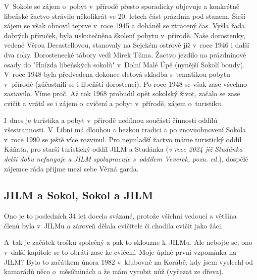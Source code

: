 \documentclass[a5paper, 11pt, twoside]{article}
\begin{document}
V~Sokole se zájem o~pobyt v~přírodě přesto sporadicky objevuje a
konkrétně libeňské žactvo strávilo několikrát ve 20. letech část
prázdnin pod stanem. Širší zájem se však obnovil teprve v~roce 1945 a
doháněl se ztracený čas. Vyšla řada dobrých příruček, byla uskutečněna
školení pobytu v~přírodě. Naše dorostenky, vedené Věrou Decastellovou,
stanovaly na Sejckém ostrově již v~roce 1946 i další dva roky.
Dorostenecké tábory vedl Mirek Tůma. Žactvo jezdilo na prázdninové osady
do "Hnízda libeňských sokolů" v~Dolní Malé Úpě (nynější Sokolí boudy).
V~roce 1948 byla předvedena dokonce sletová skladba s~tematikou pobytu
v~přírodě (zúčastnili se i libeňští dorostenci). Po roce 1948 se však zase
všechno zastavilo. Víme proč. Až rok 1968 probudil opět sokolský život,
začalo se zase cvičit a vrátil se i zájem o~cvičení a pobyt v~přírodě,
zájem o~turistiku.

I~dnes je turistika a pobyt v~přírodě nedílnou součástí činnosti oddílů
všestrannosti. V~Libni má dlouhou a hezkou tradici a po znovuobnovení
Sokola v~roce 1990 se ještě více rozvinul. Pro nejmladší žactvo máme
turistický oddíl Káňata, pro starší turistický oddíl JILM a Studánka
(\textit{v roce 2024 již Studánka delší dobu nefunguje a JILM spolupracuje
s~oddílem Veverek, pozn. ed.}), dospělé zájemce ráda přijme mezi sebe
Věrná garda.

\subsection{JILM a Sokol, Sokol a JILM}

Ono je to posledních 34 let docela svázané, protože všichni vedoucí a
většina členů byla v~JILMu a zároveň dělala cvičitele či chodila cvičit
jako žáci.

A~tak je začátek trošku společný a pak to sklouzne k~JILMu. Ale nebojte
se, ono v~další kapitole se to obrátí zase ke cvičení. Moje úplně první
vzpomínka na JILM? Bylo to začátkem února 1982 v~klubovně na Korábě, kdy
jsem vyslechl od kamarádů něco o~měsíčninách a že mám vyrobit nůž
(vyřezat ze dřeva).
\end{document}
